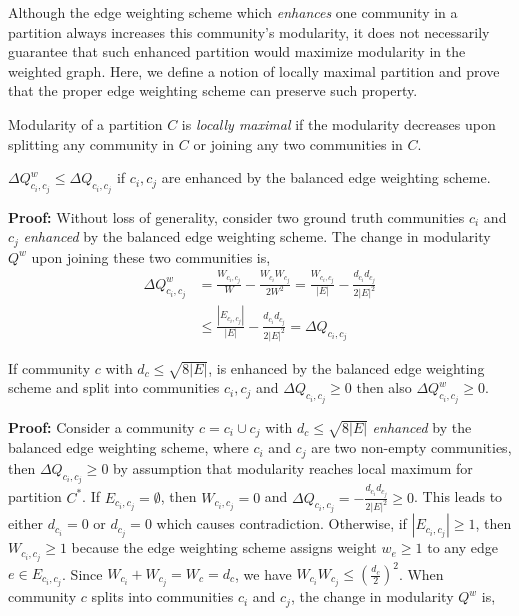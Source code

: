 Although the edge weighting scheme which \textit{enhances} one community in a partition always increases this community's modularity, it does not necessarily guarantee that such enhanced partition would maximize modularity in the weighted graph. Here, we define a notion of locally maximal partition and prove that the proper edge weighting scheme can preserve such property.
\begin{rmk} Modularity of a partition $C$ is \textit{locally maximal} if the modularity decreases upon splitting any community in $C$ or joining any two communities in $C$. \end{rmk}
\begin{thm} \label{theorem:2} $\Delta Q^w_{c_i,c_j}\leq \Delta Q_{c_i,c_j}$ if $c_i,c_j$ are enhanced by the balanced edge weighting scheme.\end{thm}
\noindent \textbf{Proof:} 
Without loss of generality, consider two ground truth communities $c_i$ and $c_j$ \textit{enhanced} by the balanced edge weighting scheme. The change in modularity $Q^w$ upon joining these two communities is,
\begin{align} \label{eq:change}
\Delta Q^w_{c_i,c_j} &=  \frac{W_{c_i, c_j}}{W} - \frac{W_{c_i}W_{c_j}}{2W^2} = \frac{W_{c_i, c_j}}{|E|} - \frac{d_{c_i} d_{c_j}}{2|E|^2}\\
& \leq \frac{|E_{c_i, c_j}|}{|E|} - \frac{d_{c_i} d_{c_j}}{2|E|^2} = \Delta Q_{c_i,c_j}
\end{align}
\begin{thm} \label{theorem:3} If community $c$ with $d_{c} \leq \sqrt{8|E|}$, is enhanced by the balanced edge weighting scheme and split into communities $c_i,c_j$ and $\Delta Q_{c_i,c_j}\geq 0$ then also $\Delta Q^w_{c_i,c_j}\geq 0$.
\end{thm}
\noindent \textbf{Proof:} 
Consider a community $c=c_i\cup c_j$ with $d_c \leq \sqrt{8|E|}$ \textit{enhanced} by the balanced edge weighting scheme, where $c_i$ and $c_j$ are two non-empty communities, then $\Delta Q_{c_i,c_j} \geq 0 $ by assumption that modularity reaches local maximum for partition $C^*$.
If $E_{c_i,c_j} = \emptyset$, then $W_{c_i, c_j} = 0$ and $ \Delta Q_{c_i,c_j} = - \frac{d_{c_i} d_{c_j}}{2|E|^2} \geq 0$. This leads to either $d_{c_i}=0$ or $d_{c_j}=0$ which causes contradiction. Otherwise, if $|E_{c_i,c_j}| \geq 1$, then $W_{c_i, c_j} \geq 1$ because the edge weighting scheme assigns weight $w_e \geq 1$ to any edge $e \in E_{c_i,c_j}$. Since $W_{c_i} + W_{c_j} = W_c = d_c$, we have $W_{c_i}W_{c_j} \leq (\frac{d_c}{2})^2$. When community $c$ splits into communities $c_i$ and $c_j$, the change in modularity $Q^w$ is,
